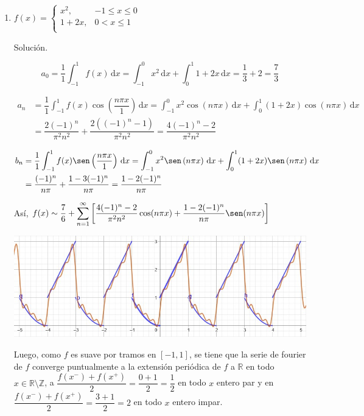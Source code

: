 \documentclass[fleqn]{article}
\newcommand{\real}{\mathbb{R}}
\newcommand{\ent}{\mathbb{Z}}
\newcommand{\intg}[3]{\int_{#1}^{#2} #3 \, \mathrm{d}x}
\begin{document}
\begin{enumerate}[I.]
\begin{enumerate}[(1)]
			\bfseries
			\item $ f(x) = \begin{cases}
				x^2, & -1 \leq x \leq 0 \\
				1 + 2x, & 0 < x \leq 1 \\
			\end{cases} $

			Solución.

			\normalfont

			\begin{equation*}
				a_0 = \dfrac{1}{1} \intg{-1}{1}{f(x)} = \intg{-1}{0}{x^2} + \intg{0}{1}{1 + 2x} = \dfrac{1}{3} + 2 = \dfrac{7}{3}
			\end{equation*}

			\begin{align*}
				a_n &= \dfrac{1}{1} \intg{-1}{1}{f(x) \cos \left( \dfrac{n \pi x}{1} \right)} = \intg{-1}{0}{x^2 \cos \left(n \pi x \right)} + \intg{0}{1}{(1 + 2x) \cos \left(n \pi x \right)} \\
				&= \dfrac{2(-1)^n}{\pi^2 n^2} + \dfrac{2((-1)^n - 1)}{\pi^2 n^2} = \dfrac{4(-1)^n - 2}{\pi^2 n^2} 
			\end{align*}

			\begin{align*}
				b_n &= \dfrac{1}{1} \intg{-1}{1}{f(x) \sen \left( \dfrac{n \pi x}{1} \right)} = \intg{-1}{0}{x^2 \sen \left(n \pi x \right)} + \intg{0}{1}{(1 + 2x) \sen \left(n \pi x \right)} \\
				&= \dfrac{(-1)^n}{n \pi} + \dfrac{1 - 3(-1)^n}{n \pi} = \dfrac{1 - 2(-1)^n}{n \pi}
			\end{align*}

			Así, $ \displaystyle f(x) \sim \dfrac{7}{6} + \sum_{n=1}^{\infty} \left[ \dfrac{4(-1)^n - 2}{\pi^2 n^2} \cos (n \pi x) + \dfrac{1 - 2(-1)^n}{n \pi} \sen (n \pi x) \right] $

			\includegraphics[width=\linewidth]{Ejer4.jpg}

			Luego, como $f$ es suave por tramos en $ [-1,1] $, se tiene que la serie de fourier de $f$ converge puntualmente a la extensión periódica de $f$ a $ \real $ en todo $ x \in \real \setminus \ent $, a $ \dfrac{f(x^-) + f(x^+)}{2} = \dfrac{0+1}{2} = \dfrac{1}{2} $ en todo $ x $ entero par y en $ \dfrac{f(x^-) + f(x^+)}{2} = \dfrac{3+1}{2} = 2 $ en todo $ x $ entero impar.


\end{enumerate}
\end{enumerate}
\end{document}
